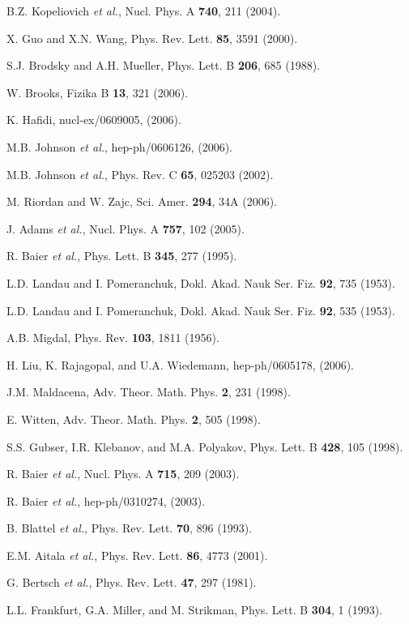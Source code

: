 \begin{thebibliography}{199}
B.Z. Kopeliovich {\it et al.}, Nucl. Phys. A {\bf 740}, 211 (2004).

X. Guo and X.N. Wang, Phys. Rev. Lett. {\bf 85}, 3591 (2000).

S.J. Brodsky and A.H. Mueller, Phys. Lett. B {\bf 206}, 685 (1988).

W. Brooks, Fizika B {\bf 13}, 321 (2006).

K. Hafidi, nucl-ex/0609005, (2006).

M.B. Johnson {\it et al.}, hep-ph/0606126, (2006).

M.B. Johnson {\it et al.}, Phys. Rev. C {\bf 65}, 025203 (2002).

M. Riordan and W. Zajc, Sci. Amer. {\bf 294}, 34A (2006).

J. Adams {\it et al.}, Nucl. Phys. A {\bf 757}, 102 (2005).

R. Baier {\it et al.}, Phys. Lett. B {\bf 345}, 277 (1995).

L.D. Landau and I. Pomeranchuk, Dokl. Akad. Nauk Ser. Fiz. {\bf 92},
735 (1953).

L.D. Landau and I. Pomeranchuk, Dokl. Akad. Nauk Ser. Fiz. {\bf 92},
535 (1953).

A.B. Migdal, Phys. Rev. {\bf 103}, 1811 (1956).

H. Liu, K. Rajagopal, and U.A. Wiedemann, hep-ph/0605178, (2006).

J.M. Maldacena, Adv. Theor. Math. Phys. {\bf 2}, 231 (1998).

E. Witten, Adv. Theor. Math. Phys. {\bf 2}, 505 (1998).

S.S. Gubser, I.R. Klebanov, and M.A. Polyakov, Phys. Lett. B {\bf 428},
105 (1998).

R. Baier {\it et al.}, Nucl. Phys. A {\bf 715}, 209 (2003).

R. Baier {\it et al.}, hep-ph/0310274, (2003).

B. Blattel {\it et al.}, Phys. Rev. Lett. {\bf 70}, 896 (1993).

E.M. Aitala {\it et al.}, Phys. Rev. Lett. {\bf 86}, 4773 (2001).

G. Bertsch {\it et al.}, Phys. Rev. Lett. {\bf 47}, 297 (1981).

L.L. Frankfurt, G.A. Miller, and M. Strikman, Phys. Lett. B {\bf 304},
1 (1993).


\end{thebibliography}
